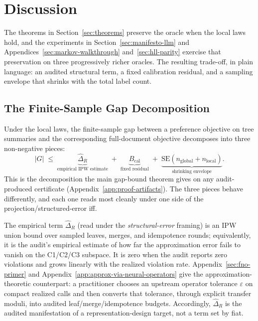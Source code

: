 \section{Discussion}\label{sec:discussion}

The theorems in Section~\ref{sec:theorems} preserve the oracle when the local laws hold, and the experiments in Section~\ref{sec:manifesto-llm} and Appendices~\ref{sec:markov-walkthrough} and~\ref{sec:hll-parity} exercise that preservation on three progressively richer oracles. The resulting trade-off, in plain language: an audited structural term, a fixed calibration residual, and a sampling envelope that shrinks with the total label count.

\subsection{The Finite-Sample Gap Decomposition}\label{sec:discussion-tradeoff}

Under the local laws, the finite-sample gap between a preference
objective on tree summaries and the corresponding full-document
objective decomposes into three non-negative pieces:
\begin{equation}\label{eq:discussion-bound}
|G|
\;\le\;
\underbrace{\hat{\Delta}_R}_{\text{empirical IPW estimate}}
\;+\;
\underbrace{B_{\mathrm{cal}}}_{\text{fixed residual}}
\;+\;
\underbrace{\text{SE}(n_{\mathrm{global}} + n_{\mathrm{local}})}_{\text{shrinking envelope}}.
\end{equation}
This is the decomposition the main gap-bound theorem gives on any audit-produced certificate (Appendix~\ref{app:proof-artifacts}). The three pieces behave differently, and each one reads most cleanly under one side of the projection/structured-error iff.

The empirical term $\hat{\Delta}_R$ (read under the \emph{structural-error} framing) is an IPW union bound over sampled leaves, merges, and idempotence rounds; equivalently, it is the audit's empirical estimate of how far the approximation error fails to vanish on the C1/C2/C3 subspace. It is zero when the audit reports zero violations and grows linearly with the realized violation rate. Appendix~\ref{sec:fno-primer} and Appendix~\ref{app:approx-via-neural-operators} give the approximation-theoretic counterpart: a practitioner chooses an upstream operator tolerance $\varepsilon$ on compact realized calls and then converts that tolerance, through explicit transfer moduli, into audited leaf/merge/idempotence budgets. Accordingly, $\hat{\Delta}_R$ is the audited manifestation of a representation-design target, not a term set by fiat.

